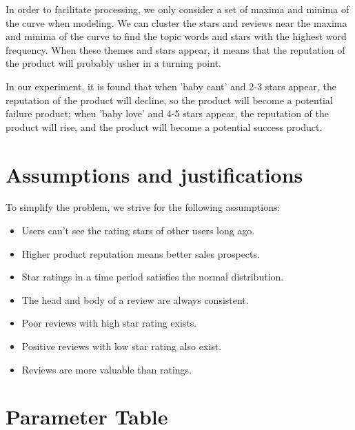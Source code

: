 \documentclass{mcmthesis}
\begin{document}
In order to facilitate processing, we only consider a set of maxima and minima of the curve when modeling. We can cluster the stars and reviews near the maxima and minima of the curve to find the topic words and stars with the highest word frequency. When these themes and stars appear, it means that the reputation of the product will probably usher in a turning point.

In our experiment, it is found that when 'baby cant' and 2-3 stars appear, the reputation of the product will decline, so the product will become a potential failure product; when 'baby love' and 4-5 stars appear, the reputation of the product will rise, and the product will become a potential success product.
\section{Assumptions and justifications}
To simplify the problem, we strive for the following assumptions:
\begin{itemize}
	\item Users can't see the rating stars of other users long ago. 
	
	\item Higher product reputation means better sales prospects.
	
	\item Star ratings in a time period satisfies the normal distribution.
	\item The head and body of a review are always consistent.
	\item Poor reviews with high star rating exists.
	\item Positive reviews with low star rating also exist.
	\item Reviews are more valuable than ratings.

	
\end{itemize}

\section{Parameter Table}
\end{document}
